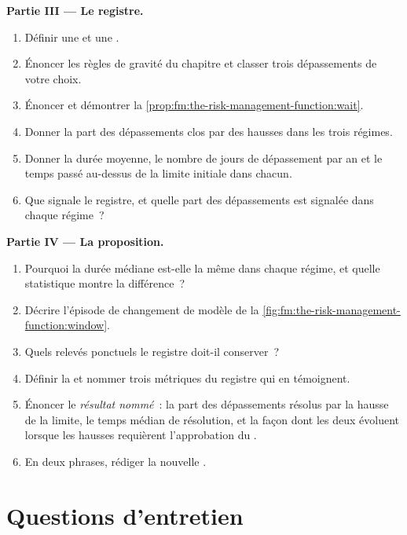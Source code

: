 \begin{problem}
\medskip\noindent\textbf{Partie III --- Le registre.}
\begin{enumerate}[resume]
\item Définir une  et une .
\item Énoncer les règles de gravité du chapitre et classer trois dépassements de votre choix.
\item Énoncer et démontrer la \cref{prop:fm:the-risk-management-function:wait}.
\item Donner la part des dépassements clos par des hausses dans les trois régimes.
\item Donner la durée moyenne, le nombre de jours de dépassement par an et le temps passé au-dessus de la limite initiale dans chacun.
\item Que signale le registre, et quelle part des dépassements est signalée dans chaque régime~?
\end{enumerate}

\medskip\noindent\textbf{Partie IV --- La proposition.}
\begin{enumerate}[resume]
\item Pourquoi la durée médiane est-elle la même dans chaque régime, et quelle statistique montre la différence~?
\item Décrire l'épisode de changement de modèle de la \cref{fig:fm:the-risk-management-function:window}.
\item Quels relevés ponctuels le registre doit-il conserver~?
\item Définir la  et nommer trois métriques du registre qui en témoignent.
\item Énoncer le \emph{résultat nommé}~: la part des dépassements résolus par la hausse de la limite, le temps médian de résolution, et la façon dont les deux évoluent lorsque
les hausses requièrent l'approbation du .
\item En deux phrases, rédiger la nouvelle .
\end{enumerate}
\end{problem}

\section{Questions d'entretien}

